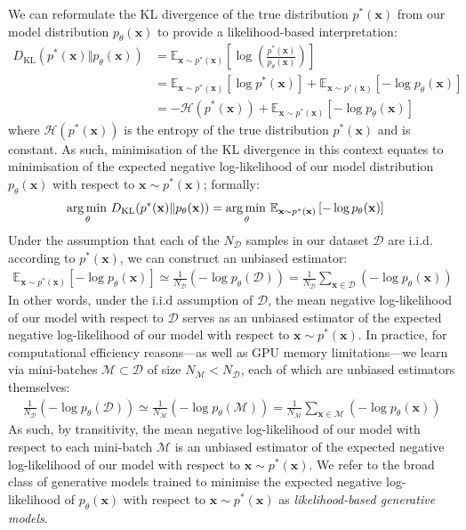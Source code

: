 \documentclass[ oneside,%
                    author={George Herbert},
                    degree={MSci},
                     title={Diffusion Models for Time-Evolving Precipitation Fields},
                  subtitle={}]{dissertation}
\begin{document}
We can reformulate the KL divergence of the true distribution $p^*(\mathbf{x})$ from our model distribution $p_\theta(\mathbf{x})$ to provide a likelihood-based interpretation:
\begin{align}
      D_{\mathrm{KL}}(p^*(\mathbf{x})\Vert p_\theta(\mathbf{x}))&=\mathbb{E}_{\mathbf{x}\sim p^*(\mathbf{x})}\left[\log\left(\frac{p^*(\mathbf{x})}{p_\theta(\mathbf{x})}\right)\right]\\
      &=\mathbb{E}_{\mathbf{x}\sim p^*(\mathbf{x})}\left[\log p^*(\mathbf{x})\right]+\mathbb{E}_{\mathbf{x}\sim p^*(\mathbf{x})}\left[-\log p_\theta(\mathbf{x})\right]\\
      &=-\mathcal{H}(p^*(\mathbf{x}))+\mathbb{E}_{\mathbf{x}\sim p^*(\mathbf{x})}\left[-\log p_\theta(\mathbf{x})\right]
\end{align}
where $\mathcal{H}{(p^*(\mathbf{x}))}$ is the entropy of the true distribution $p^*(\mathbf{x})$ and is constant. As such, minimisation of the KL divergence in this context equates to minimisation of the expected negative log-likelihood of our model distribution $p_\theta(\mathbf{x})$ with respect to $\mathbf{x}\sim p^*(\mathbf{x})$; formally:
\begin{align}
      \operatorname*{arg\,min\,}_\theta D_{\mathrm{KL}}(p^*(\mathbf{x})\Vert p_\theta(\mathbf{x}))&=\operatorname*{arg\,min\,}_\theta \mathbb{E}_{\mathbf{x}\sim p^*(\mathbf{x})}\left[-\log p_\theta(\mathbf{x})\right]
\end{align}
Under the assumption that each of the $N_\mathcal{D}$ samples in our dataset $\mathcal{D}$ are i.i.d. according to $p^*(\mathbf{x})$, we can construct an unbiased estimator:
\begin{align}
      \mathbb{E}_{\mathbf{x}\sim p^*(\mathbf{x})}\left[-\log p_\theta(\mathbf{x})\right]\simeq \frac{1}{N_{\mathcal{D}}}\left(-\log p_\theta(\mathcal{D})\right) = \frac{1}{N_{\mathcal{D}}} \sum_{\mathbf{x}\in\mathcal{D}} \left(-\log p_\theta(\mathbf{x})\right)
\end{align}
In other words, under the i.i.d assumption of $\mathcal{D}$, the mean negative log-likelihood of our model with respect to $\mathcal{D}$ serves as an unbiased estimator of the expected negative log-likelihood of our model with respect to $\mathbf{x}\sim p^*(\mathbf{x})$. In practice, for computational efficiency reasons---as well as GPU memory limitations---we learn via mini-batches $\mathcal{M}\subset \mathcal{D}$ of size $N_\mathcal{M} < N_\mathcal{D}$, each of which are unbiased estimators themselves:
\begin{align}
      \frac{1}{N_\mathcal{D}}\left(-\log p_\theta(\mathcal{D})\right)\simeq \frac{1}{N_\mathcal{M}}\left(-\log p_\theta(\mathcal{M})\right)=\frac{1}{N_\mathcal{M}}\sum_{\mathbf{x}\in\mathcal{M}}\left(-\log p_\theta(\mathbf{x})\right)
\end{align}
As such, by transitivity, the mean negative log-likelihood of our model with respect to each mini-batch $\mathcal{M}$ is an unbiased estimator of the expected negative log-likelihood of our model with respect to $\mathbf{x}\sim p^*(\mathbf{x})$. We refer to the broad class of generative models trained to minimise the expected negative log-likelihood of $p_\theta(\mathbf{x})$ with respect to $\mathbf{x}\sim p^*(\mathbf{x})$ as \textit{likelihood-based generative models}.
\end{document}
